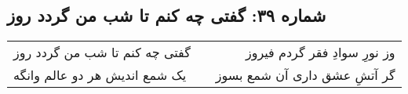 \begin{center}
\section*{شماره ۳۹: گفتی چه کنم تا شب من گردد روز}
\label{sec:039}
\begin{longtable}{l p{0.5cm} r}
گفتی چه کنم تا شب من گردد روز
&&
وز نورِ سوادِ فقر گردم فیروز
\\
یک شمع اندیش هر دو عالم وانگه
&&
گر آتشِ عشق داری آن شمع بسوز
\\
\end{longtable}
\end{center}

